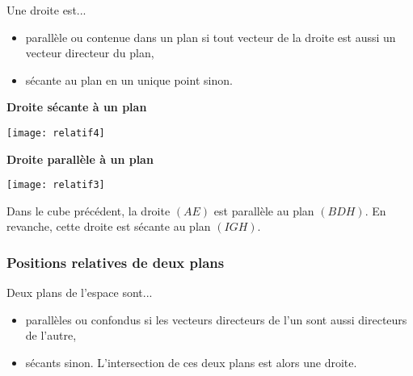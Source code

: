 \documentclass[11pt,fleqn, openany]{book} %
\begin{document}
\begin{proposition}Une droite est...
\begin{itemize}
\item parallèle ou contenue dans un plan si tout vecteur de la droite est aussi un vecteur directeur du plan,
\item sécante au plan en un unique point sinon.
\end{itemize}\end{proposition}

\begin{minipage}{0.45\linewidth}\begin{center}
\textbf{Droite sécante à un plan}
\end{center}
\begin{center}
\texttt{[image: relatif4]}
\end{center}
\end{minipage}\hfill \begin{minipage}{0.45\linewidth}\begin{center}
\textbf{Droite parallèle à un plan}
\end{center}
\begin{center}
\texttt{[image: relatif3]}
\end{center}
\end{minipage}

\begin{example}Dans le cube précédent, la droite $(AE)$ est parallèle au plan $(BDH)$. En revanche, cette droite est sécante au plan $(IGH)$.\end{example}

\newpage

\subsubsection{Positions relatives de deux plans}

\begin{proposition}Deux plans de l'espace sont...
\begin{itemize}
\item parallèles ou confondus si les vecteurs directeurs de l'un sont aussi directeurs de l'autre,
\item sécants sinon. L'intersection de ces deux plans est alors une droite.
\end{itemize}\vspace{-0.5cm}\end{proposition}
\end{document}

